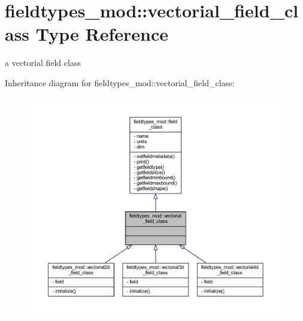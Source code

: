 \hypertarget{structfieldtypes__mod_1_1vectorial__field__class}{}\section{fieldtypes\+\_\+mod\+:\+:vectorial\+\_\+field\+\_\+class Type Reference}
\label{structfieldtypes__mod_1_1vectorial__field__class}


a vectorial field class  




Inheritance diagram for fieldtypes\+\_\+mod\+:\+:vectorial\+\_\+field\+\_\+class\+:\nopagebreak
\begin{figure}[H]
\begin{center}
\leavevmode
\includegraphics[width=350pt]{structfieldtypes__mod_1_1vectorial__field__class__inherit__graph}
\end{center}
\end{figure}


